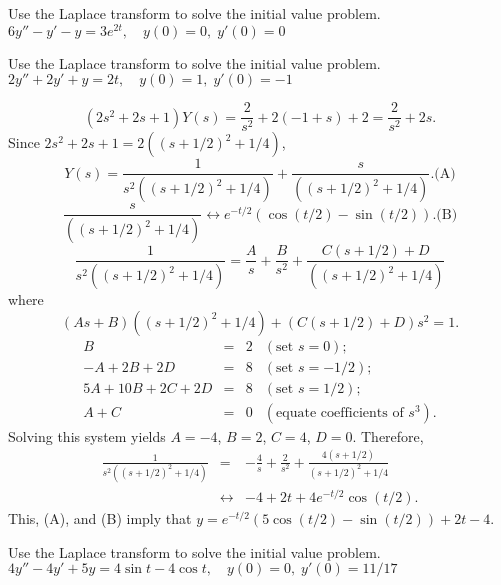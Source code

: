 \documentclass{ximera}
\begin{document}
\begin{problem}\label{exer:8.3.33} Use the Laplace transform to solve the initial value problem. $6y''-y'-y=3e^{2t}, \quad   y(0)=0,\;  y'(0)=0$
\end{problem}

\begin{problem}\label{exer:8.3.34} Use the Laplace transform to solve the initial value problem. $2y''+2y'+y=2t, \quad   y(0)=1,\;  y'(0)=-1$

\begin{solution}
$$
(2s^2+2s+1)Y(s)=\frac{2}{s^2}+2(-1+s)+2=\frac{2}{s^2}+2s.
$$
Since $2s^2+2s+1=2((s+1/2)^2+1/4)$,
$$
Y(s)=\frac{1}{s^2((s+1/2)^2+1/4)}+\frac{s}{((s+1/2)^2+1/4)}.
\text{(A)}
$$
$$
\frac{s}{((s+1/2)^2+1/4)}\leftrightarrow
e^{-t/2}(\cos(t/2)-\sin(t/2)).
\text{(B)}
$$
$$
 \frac{1}{s^2((s+1/2)^2+1/4)}=\frac{A}{s}+\frac{B}{s^2}
+\frac{C(s+1/2)+D}{((s+1/2)^2+1/4)}
$$
where
$$
(As+B)((s+1/2)^2+1/4)+(C(s+1/2)+D)s^2=1.
$$
$$
\begin{array}{rcrl}
B&=&2&(\mbox{set }s=0);\\
-A+2B+2D&=&8& (\mbox{set }s=-1/2);\\
5A+10B+2C+2D&=&8& (\mbox{set }s=1/2);\\
A+C&=&0&(\mbox{equate coefficients of }s^3).
\end{array}
$$
Solving this system yields $A=-4$, $B=2$,
$C=4$, $D=0$. Therefore,
\begin{eqnarray*}
\frac{1}{s^2((s+1/2)^2+1/4)}
&=&
-\frac{4}{s}+\frac{2}{s^2}
+\frac{4(s+1/2)}{(s+1/2)^2+1/4}
\\&\leftrightarrow&
-4+2t+4e^{-t/2}\cos(t/2).
\end{eqnarray*}
This, (A), and (B) imply that
$y=e^{-t/2}(5\cos(t/2)-\sin(t/2))+2t-4$.
\end{solution}
\end{problem}

\begin{problem}\label{exer:8.3.35} Use the Laplace transform to solve the initial value problem. $4y''-4y'+5y=4\sin t-4\cos t, \quad   y(0)=0,\;  y'(0)=11/17$
\end{problem}
\end{document}
